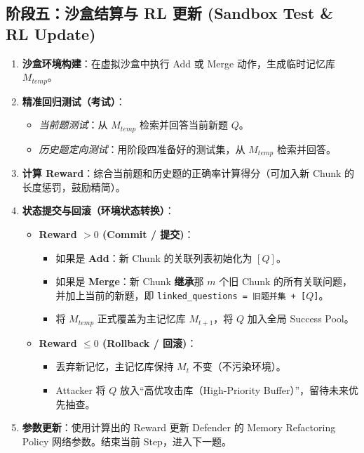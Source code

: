\documentclass[a4paper,11pt]{article}
\begin{document}
\subsection*{阶段五：沙盒结算与 RL 更新 (Sandbox Test \& RL Update)}
\begin{enumerate}[resume]
    \item \textbf{沙盒环境构建}：在虚拟沙盒中执行 Add 或 Merge 动作，生成临时记忆库 \(M_{temp}\)。
    \item \textbf{精准回归测试（考试）}：
    \begin{itemize}
        \item \textit{当前题测试}：从 \(M_{temp}\) 检索并回答当前新题 \(Q\)。
        \item \textit{历史题定向测试}：用阶段四准备好的测试集，从 \(M_{temp}\) 检索并回答。
    \end{itemize}
    \item \textbf{计算 Reward}：综合当前题和历史题的正确率计算得分（可加入新 Chunk 的长度惩罚，鼓励精简）。
    \item \textbf{状态提交与回滚（环境状态转换）}：
    \begin{itemize}
        \item \textbf{Reward \(> 0\) (Commit / 提交)}：
        \begin{itemize}
            \item 如果是 \textbf{Add}：新 Chunk 的关联列表初始化为 \([Q]\)。
            \item 如果是 \textbf{Merge}：新 Chunk \textbf{继承}那 \(m\) 个旧 Chunk 的所有关联问题，并加上当前的新题，即 \texttt{linked\_questions = 旧题并集 + [\(Q\)]}。
            \item 将 \(M_{temp}\) 正式覆盖为主记忆库 \(M_{t+1}\)，将 \(Q\) 加入全局 Success Pool。
        \end{itemize}
        \item \textbf{Reward \(\le 0\) (Rollback / 回滚)}：
        \begin{itemize}
            \item 丢弃新记忆，主记忆库保持 \(M_t\) 不变（不污染环境）。
            \item Attacker 将 \(Q\) 放入“高优攻击库（High-Priority Buffer）”，留待未来优先抽查。
        \end{itemize}
    \end{itemize}
    \item \textbf{参数更新}：使用计算出的 Reward 更新 Defender 的 Memory Refactoring Policy 网络参数。结束当前 Step，进入下一题。
\end{enumerate}
\end{document}

